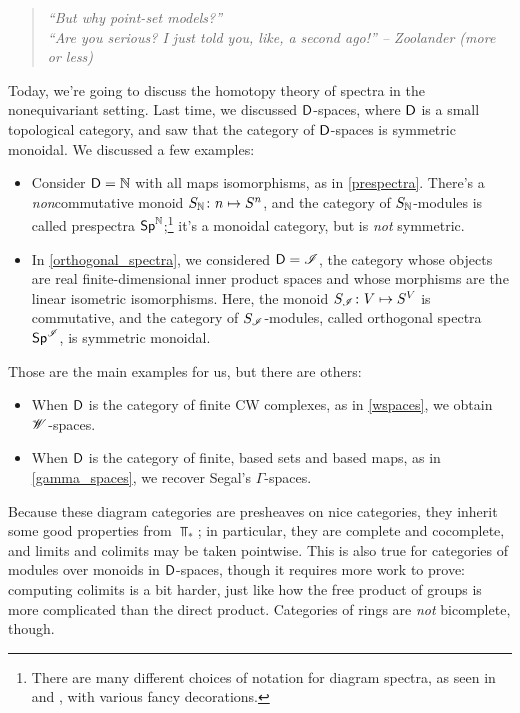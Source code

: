\begin{quote}\textit{
	``But why point-set models?''\\
	``Are you serious? I just told you, like, a second ago!'' -- Zoolander (more or less)
}\end{quote}
Today, we're going to discuss the homotopy theory of spectra in the nonequivariant setting. Last time, we discussed
$\mathsf D$-spaces, where $\mathsf D$ is a small topological category, and saw that the category of $\mathsf D$-spaces is symmetric
monoidal. We discussed a few examples:
\begin{itemize}
	\item Consider $\mathsf D = \mathbb N$ with all maps isomorphisms, as in \cref{prespectra}. There's a \emph{non}commutative
	monoid $S_\N\colon n\mapsto S^n$, and the category of $S_\mathbb N$-modules is called prespectra
	$\mathsf{Sp}^\mathbb N$;\footnote{There are many different choices of notation for diagram spectra, as seen in~\cite{MMSS}
	and \cite{MandellMay}, with various fancy decorations.} it's a monoidal category, but is \emph{not} symmetric.
	\item In \cref{orthogonal_spectra}, we considered $\mathsf D = \mathscr I$, the category whose objects are real
	finite-dimensional inner product spaces and whose morphisms are the linear isometric isomorphisms. Here, the
	monoid $S_\sI\colon V\mapsto S^V$ is commutative, and the category of $S_\mathscr I$-modules, called orthogonal
	spectra $\mathsf{Sp}^\mathscr I$, is symmetric monoidal.
\end{itemize}
Those are the main examples for us, but there are others:
\begin{itemize}
	\item When $\mathsf D$ is the category of finite CW complexes, as in \cref{wspaces}, we obtain $\mathscr W$-spaces.
	\item When $\mathsf D$ is the category of finite, based sets and based maps, as in \cref{gamma_spaces}, we recover
	Segal's $\Gamma$-spaces.
\end{itemize}
Because these diagram categories are presheaves on nice categories, they inherit some good properties from $\Top_*$;
in particular, they are complete and cocomplete, and limits and colimits may be taken pointwise. This is also true
for categories of modules over monoids in $\mathsf D$-spaces, though it requires more work to prove: computing colimits
is a bit harder, just like how the free product of groups is more complicated than the direct product. Categories
of rings are \emph{not} bicomplete, though.

